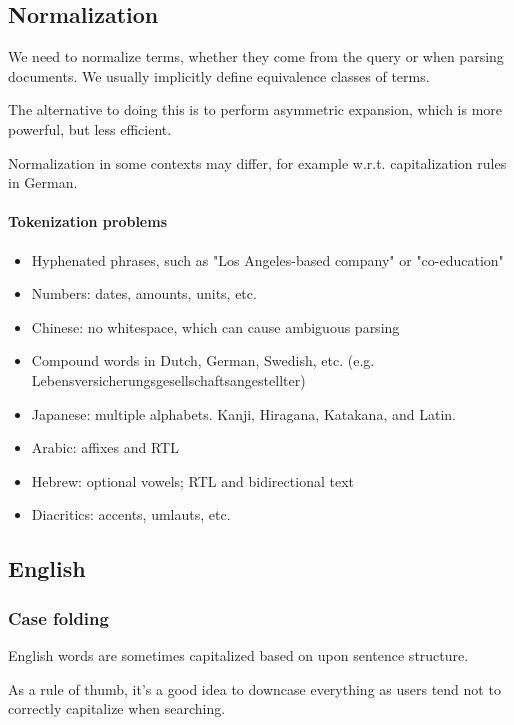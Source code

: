 \documentclass{idc_msc}
\begin{document}
\subsection{Normalization}

We need to normalize terms, whether they come from the query or when parsing documents.
We usually implicitly define equivalence classes of terms.

The alternative to doing this is to perform asymmetric expansion, which is more powerful, but less efficient.

Normalization in some contexts may differ, for example w.r.t. capitalization rules in German.

\paragraph{Tokenization problems}

\begin{itemize}
  \item Hyphenated phrases, such as "Los Angeles-based company" or "co-education"
  \item Numbers: dates, amounts, units, etc.
  \item Chinese: no whitespace, which can cause ambiguous parsing
  \item Compound words in Dutch, German, Swedish, etc. (e.g. Lebensversicherungsgesellschaftsangestellter)
  \item Japanese: multiple alphabets. Kanji, Hiragana, Katakana, and Latin.
  \item Arabic: affixes and RTL
  \item Hebrew: optional vowels; RTL and bidirectional text
  \item Diacritics: accents, umlauts, etc.
\end{itemize}

\subsection{English}

\subsubsection{Case folding}

English words are sometimes capitalized based on upon sentence structure.

As a rule of thumb, it's a good idea to downcase everything as users tend not to correctly capitalize when searching.
\end{document}
